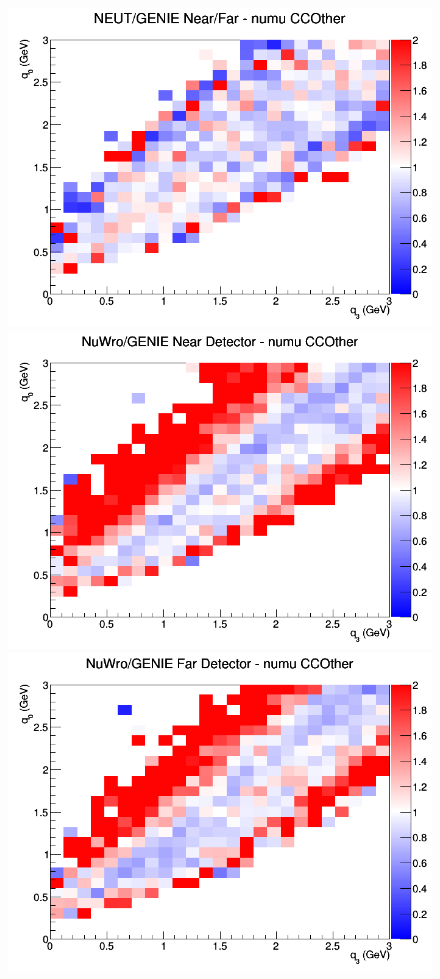 \documentclass[12pt]{article}
\begin{document}
\begin{figure}[h]
\endminipage
{}
\includegraphics[width=\linewidth]{eff_q0_q3/FGT/ratios/CCOther_NEUT_GENIE_numu_NF_q3_q0.png}
\endminipage
\newline
{}
\includegraphics[width=\linewidth]{eff_q0_q3/FGT/ratios/CCOther_NuWro_GENIE_numu_near_q3_q0.png}
\endminipage
{}
\includegraphics[width=\linewidth]{eff_q0_q3/FGT/ratios/CCOther_NuWro_GENIE_numu_far_q3_q0.png}

\end{figure}
\end{document}
